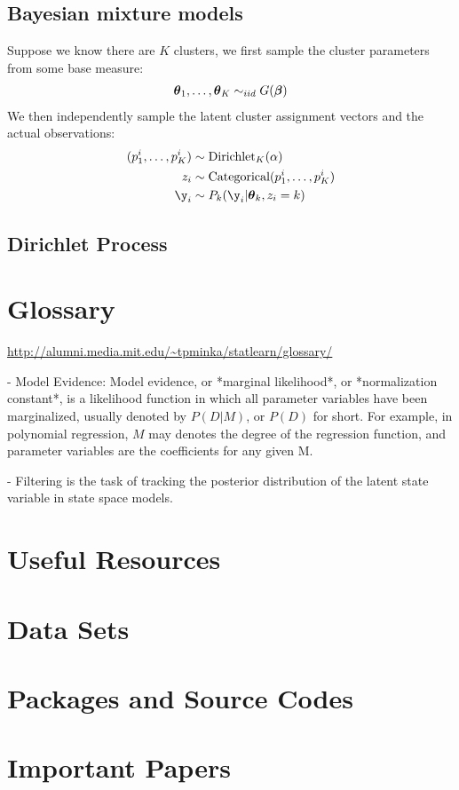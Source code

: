 \subsection{Bayesian mixture models}
Suppose we know there are $K$ clusters, we first sample the cluster parameters from some base measure:
\begin{align}
{\boldsymbol{\theta}}_1, \dots, {\boldsymbol{\theta}}_K \sim_{iid} G({\boldsymbol{\beta}})
\end{align}
We then independently sample the latent cluster assignment vectors and the actual observations:
\begin{align}
(p_1^i, \dots, p_K^i) &\sim \text{Dirichlet}_K(\alpha)\\
z_i &\sim \text{Categorical}(p_1^i, \dots, p_K^i)\\
\y_i &\sim P_k(\y_i | \btheta_k, z_i = k)
\end{align}

\subsection{Dirichlet Process}

\section{Glossary}
\url{http://alumni.media.mit.edu/~tpminka/statlearn/glossary/}


- Model Evidence: Model evidence, or *marginal likelihood*, or *normalization constant*, is a likelihood function in which all parameter variables have been marginalized, usually denoted by $P(D|M)$, or $P(D)$ for short. For example, in polynomial regression, $M$ may denotes the degree of the regression function, and parameter variables are the coefficients for any given M.

- Filtering is the task of tracking the posterior distribution of the latent state variable in state space models.

\section{Useful Resources}
\section{Data Sets}
\section{Packages and Source Codes}
\section{Important Papers}
